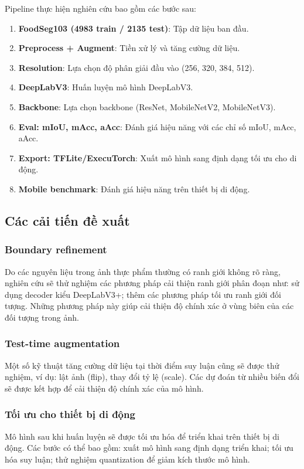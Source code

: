 Pipeline thực hiện nghiên cứu bao gồm các bước sau:
\begin{enumerate}
    \item \textbf{FoodSeg103 (4983 train / 2135 test)}: Tập dữ liệu ban đầu.
    \item \textbf{Preprocess + Augment}: Tiền xử lý và tăng cường dữ liệu.
    \item \textbf{Resolution}: Lựa chọn độ phân giải đầu vào (256, 320, 384, 512).
    \item \textbf{DeepLabV3}: Huấn luyện mô hình DeepLabV3.
    \item \textbf{Backbone}: Lựa chọn backbone (ResNet, MobileNetV2, MobileNetV3).
    \item \textbf{Eval: mIoU, mAcc, aAcc}: Đánh giá hiệu năng với các chỉ số mIoU, mAcc, aAcc.
    \item \textbf{Export: TFLite/ExecuTorch}: Xuất mô hình sang định dạng tối ưu cho di động.
    \item \textbf{Mobile benchmark}: Đánh giá hiệu năng trên thiết bị di động.
\end{enumerate}

\subsection{Các cải tiến đề xuất}

\subsubsection{Boundary refinement}
Do các nguyên liệu trong ảnh thực phẩm thường có ranh giới không rõ ràng, nghiên cứu sẽ thử nghiệm các phương pháp cải thiện ranh giới phân đoạn như: sử dụng decoder kiểu DeepLabV3+; thêm các phương pháp tối ưu ranh giới đối tượng. Những phương pháp này giúp cải thiện độ chính xác ở vùng biên của các đối tượng trong ảnh.

\subsubsection{Test-time augmentation}
Một số kỹ thuật tăng cường dữ liệu tại thời điểm suy luận cũng sẽ được thử nghiệm, ví dụ: lật ảnh (flip), thay đổi tỷ lệ (scale). Các dự đoán từ nhiều biến đổi sẽ được kết hợp để cải thiện độ chính xác của mô hình.

\subsubsection{Tối ưu cho thiết bị di động}
Mô hình sau khi huấn luyện sẽ được tối ưu hóa để triển khai trên thiết bị di động. Các bước có thể bao gồm: xuất mô hình sang định dạng triển khai; tối ưu hóa suy luận; thử nghiệm quantization để giảm kích thước mô hình.

